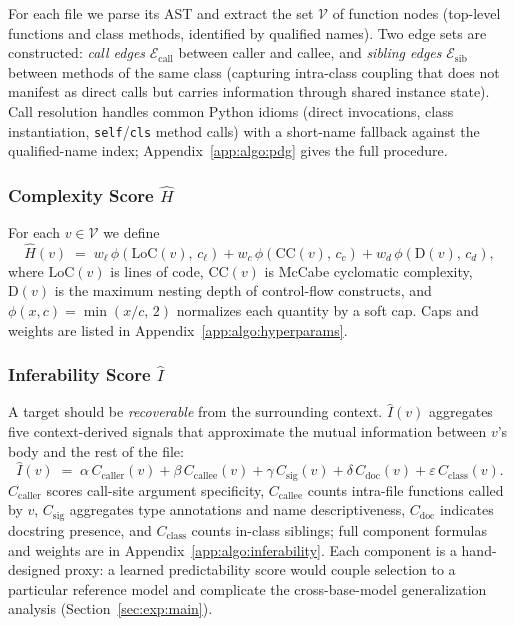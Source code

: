 For each file we parse its AST and extract the set $\mathcal{V}$ of
function nodes (top-level functions and class methods, identified by
qualified names). Two edge sets are constructed: \emph{call edges}
$\mathcal{E}_{\mathrm{call}}$ between caller and callee, and
\emph{sibling edges} $\mathcal{E}_{\mathrm{sib}}$ between methods of the
same class (capturing intra-class coupling that does not manifest as
direct calls but carries information through shared instance state).
Call resolution handles common Python idioms (direct invocations, class
instantiation, \texttt{self}/\texttt{cls} method calls) with a
short-name fallback against the qualified-name index;
Appendix~\ref{app:algo:pdg} gives the full procedure.

\subsubsection{Complexity Score $\hat{H}$}
\label{sec:method:complexity}

For each $v \in \mathcal{V}$ we define
\vspace{-0.5ex}
\begin{equation}
  \hat{H}(v) \;=\; w_{\ell}\,\phi\!\left(\mathrm{LoC}(v),\,c_{\ell}\right)
            + w_{c}\,\phi\!\left(\mathrm{CC}(v),\,c_{c}\right)
            + w_{d}\,\phi\!\left(\mathrm{D}(v),\,c_{d}\right),
  \label{eq:complexity}
\end{equation}
where $\mathrm{LoC}(v)$ is lines of code, $\mathrm{CC}(v)$ is McCabe
cyclomatic complexity, $\mathrm{D}(v)$ is the maximum nesting depth of
control-flow constructs, and $\phi(x,c)\!=\!\min(x/c,\,2)$ normalizes
each quantity by a soft cap. Caps and weights are listed in
Appendix~\ref{app:algo:hyperparams}.

\subsubsection{Inferability Score $\hat{I}$}
\label{sec:method:inferability}

A target should be \emph{recoverable} from the surrounding context.
$\hat{I}(v)$ aggregates five context-derived signals that approximate
the mutual information between $v$'s body and the rest of the file:
\vspace{-0.5ex}
\begin{equation}
  \hat{I}(v) \;=\; \alpha\,C_{\mathrm{caller}}(v)
              + \beta\,C_{\mathrm{callee}}(v)
              + \gamma\,C_{\mathrm{sig}}(v)
              + \delta\,C_{\mathrm{doc}}(v)
              + \varepsilon\,C_{\mathrm{class}}(v).
  \label{eq:inferability}
\end{equation}
$C_{\mathrm{caller}}$ scores call-site argument specificity,
$C_{\mathrm{callee}}$ counts intra-file functions called by $v$,
$C_{\mathrm{sig}}$ aggregates type annotations and name descriptiveness,
$C_{\mathrm{doc}}$ indicates docstring presence, and
$C_{\mathrm{class}}$ counts in-class siblings; full component formulas
and weights are in Appendix~\ref{app:algo:inferability}. Each component
is a hand-designed proxy: a learned predictability score would couple
selection to a particular reference model and complicate the
cross-base-model generalization analysis (Section~\ref{sec:exp:main}).

